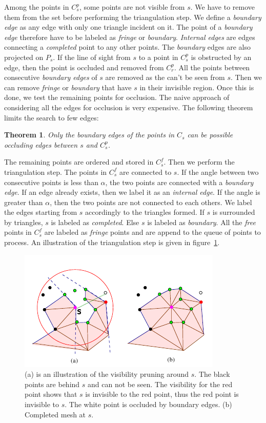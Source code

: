 \documentclass[12pt]{article}
\begin{document}
Among the points in $C^p_s$, some points are not visible from $s$. We have to remove them from the set before performing the triangulation step. We define a \textit{boundary edge} as any edge with only one triangle incident on it. The point of a \textit{boundary edge} therefore have to be labeled as \textit{fringe} or \textit{boundary}. \textit{Internal edges} are edges connecting a \textit{completed} point to any other points. The \textit{boundary} edges are also projected on $P_s$. If the line of sight from $s$ to a point in $C^p_s$ is obstructed by an edge, then the point is occluded and removed from $C^p_r$. All the points between consecutive \textit{boundary edges} of $s$ are removed as the can't be seen from $s$. Then we can remove \textit{fringe} or \textit{boundary} that have $s$ in their invisible region. Once this is done, we test the remaining points for occlusion. The naive approach of considering all the edges for occlusion is very expensive. The following theorem limits the search to few edges:
\newtheorem{mydef}{Theorem}
\begin{mydef}
Only the \emph{boundary edges} of the points in $C_s$ can be possible occluding edges between $s$ and $C^p_s$.
\end{mydef}

The remaining points are ordered and stored in $C^f_s$. Then we perform the triangulation step. The points in $C^f_s$ are connected to $s$. If the angle between two consecutive points is less than $\alpha$, the two points are connected with a \emph{boundary edge}. If an edge already exists, then we label it as an \emph{internal edge}. If the angle is greater than $\alpha$, then the two points are not connected to each others. We label the edges starting from $s$ accordingly to the triangles formed. If $s$ is surrounded by triangles, $s$ is labeled as \emph{completed}. Else $s$ is labeled as \emph{boundary}. All the \emph{free} points in $C^f_s$ are labeled as \emph{fringe} points and are append to the queue of points to process. An illustration of the triangulation step is given in figure~\ref{proj}.

\begin{figure}[h]
  \centering
  \includegraphics[scale=0.5]{proj.png}
  \caption{\label{proj} (a) is an illustration of the visibility pruning around $s$. The black points are behind $s$ and can not be seen. The visibility for the red point shows that $s$ is invisible to the red point, thus the red point is invisible to $s$. The white point is occluded by boundary edges. (b) Completed mesh at $s$.
}
\end{figure}
\end{document}
